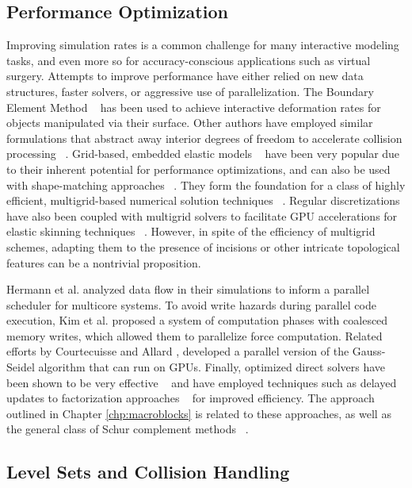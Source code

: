\subsection{Performance Optimization}
Improving simulation rates is a common challenge for many interactive
modeling tasks, and even more so for accuracy-conscious applications
such as virtual surgery. Attempts to improve performance have either
relied on new data structures, faster solvers, or aggressive use of
parallelization. The Boundary Element Method ~\citep{JamesP:1999} has
been used to achieve interactive deformation rates for objects
manipulated via their surface. Other authors have employed similar
formulations that abstract away interior degrees of freedom to
accelerate collision processing ~\citep{GaoMS:2014}. Grid-based,
embedded elastic models
~\citep{MuellTG:2004,NesmePF:2006,McAdaZSETTS:2011,PatteMS:2012,MitchCS:2015}
have been very popular due to their inherent potential for performance
optimizations, and can also be used with shape-matching approaches
~\citep{RiverJ:2007}. They form the foundation for a class of highly
efficient, multigrid-based numerical solution techniques
~\citep{ZhuSTB:2010,GeorgW:2008,DickGW:2011}.  Regular discretizations
have also been coupled with multigrid solvers to facilitate GPU
accelerations for elastic skinning techniques ~\citep{McAdaST:2010}.
However, in spite of the efficiency of multigrid schemes, adapting
them to the presence of incisions or other intricate topological
features can be a nontrivial proposition.

Hermann et al.\!   analyzed data flow in their
simulations to inform a parallel scheduler for multicore systems. To
avoid write hazards during parallel code execution, Kim et al.\!
 proposed a system of computation phases with
coalesced memory writes, which allowed them to parallelize force
computation. Related efforts by Courtecuisse and Allard
, developed a parallel version of the
Gauss-Seidel algorithm that can run on GPUs. Finally, optimized direct
solvers have been shown to be very effective ~\citep{SinSB:2013} and
have employed techniques such as delayed updates to factorization
approaches ~\citep{HechtLSO:2012} for improved efficiency. The
approach outlined in Chapter \ref{chp:macroblocks} is related to these
approaches, as well as the general class of Schur complement methods
~\citep{QuartV:1999}.

\subsection{Level Sets and Collision Handling}

